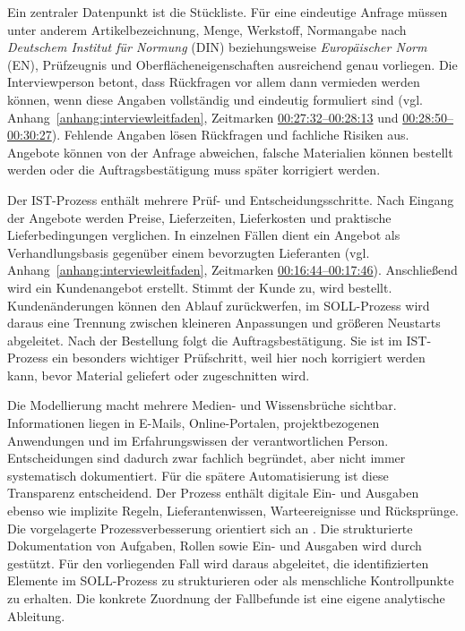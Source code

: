 \documentclass[a4paper,12pt]{article}
\begin{document}
Ein zentraler Datenpunkt ist die Stückliste. Für eine eindeutige Anfrage müssen unter anderem Artikelbezeichnung, Menge, Werkstoff, Normangabe nach \textit{Deutschem Institut für Normung} (DIN) beziehungsweise \textit{Europäischer Norm} (EN), Prüfzeugnis und Oberflächeneigenschaften ausreichend genau vorliegen. Die Interviewperson betont, dass Rückfragen vor allem dann vermieden werden können, wenn diese Angaben vollständig und eindeutig formuliert sind (vgl. Anhang~\ref{anhang:interviewleitfaden}, Zeitmarken \hyperlink{itv:rueckfragen-anfragedaten}{00:27:32--00:28:13} und \hyperlink{itv:anfragedaten}{00:28:50--00:30:27}). Fehlende Angaben lösen Rückfragen und fachliche Risiken aus. Angebote können von der Anfrage abweichen, falsche Materialien können bestellt werden oder die Auftragsbestätigung muss später korrigiert werden.

Der IST-Prozess enthält mehrere Prüf- und Entscheidungsschritte. Nach Eingang der Angebote werden Preise, Lieferzeiten, Lieferkosten und praktische Lieferbedingungen verglichen. In einzelnen Fällen dient ein Angebot als Verhandlungsbasis gegenüber einem bevorzugten Lieferanten (vgl. Anhang~\ref{anhang:interviewleitfaden}, Zeitmarken \hyperlink{itv:verhandlungsbasis}{00:16:44--00:17:46}). Anschließend wird ein Kundenangebot erstellt. Stimmt der Kunde zu, wird bestellt. Kundenänderungen können den Ablauf zurückwerfen, im SOLL-Prozess wird daraus eine Trennung zwischen kleineren Anpassungen und größeren Neustarts abgeleitet. Nach der Bestellung folgt die Auftragsbestätigung. Sie ist im IST-Prozess ein besonders wichtiger Prüfschritt, weil hier noch korrigiert werden kann, bevor Material geliefert oder zugeschnitten wird.

Die Modellierung macht mehrere Medien- und Wissensbrüche sichtbar. Informationen liegen in E-Mails, Online-Portalen, projektbezogenen Anwendungen und im Erfahrungswissen der verantwortlichen Person. Entscheidungen sind dadurch zwar fachlich begründet, aber nicht immer systematisch dokumentiert. Für die spätere Automatisierung ist diese Transparenz entscheidend. Der Prozess enthält digitale Ein- und Ausgaben ebenso wie implizite Regeln, Lieferantenwissen, Warteereignisse und Rücksprünge. Die vorgelagerte Prozessverbesserung orientiert sich an \textcite{stravinskiene_process_2021}. Die strukturierte Dokumentation von Aufgaben, Rollen sowie Ein- und Ausgaben wird durch \textcite{moreira_methodology_2025} gestützt. Für den vorliegenden Fall wird daraus abgeleitet, die identifizierten Elemente im SOLL-Prozess zu strukturieren oder als menschliche Kontrollpunkte zu erhalten. Die konkrete Zuordnung der Fallbefunde ist eine eigene analytische Ableitung.
\end{document}
